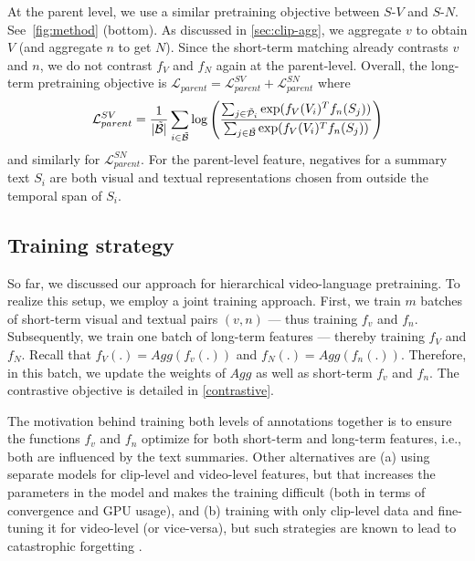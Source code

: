 \documentclass[10pt,twocolumn,letterpaper]{article}
\newcommand{\ccCR}[1]{{\color{black}{}#1}}
\begin{document}
At the parent level, we use a similar pretraining objective between $S$-$V$ and $S$-$N$. See~\cref{fig:method} (bottom).  As discussed in \cref{sec:clip-agg}, we aggregate $v$ to obtain $V$ (and aggregate $n$ to get $N$). Since the short-term matching already contrasts $v$ and $n$, we do not contrast $f_V$ and $f_N$ again at the parent-level. 
Overall, the long-term pretraining objective is $\mathcal{L}_{parent} = \mathcal{L}^{SV}_{parent} + \mathcal{L}^{SN}_{parent}$ where 
$$\mathcal{L}^{SV}_{parent} = \frac{1}{|\Tilde{\mathcal{B}}|} \sum_{i \in \tilde{\mathcal{B}}} \log \left(\frac{\sum_{j \in \mathcal{\tilde{P}}_i} \text{exp}({f_V(V_i)^Tf_n(S_j)})}{ \sum_{j \in \tilde{\mathcal{B}}} \text{exp}(f_V(V_i)^Tf_n(S_j))}\right)$$
and similarly for $\mathcal{L}^{SN}_{parent}$. For the parent-level feature, negatives for a summary text $S_i$ are both visual and textual representations chosen from outside the temporal span of $S_i$.






\subsection{Training strategy} 
\label{pre-train-strategy}


So far, we discussed our approach for hierarchical video-language pretraining. To realize this setup, we employ a joint training approach. First, we train $m$ batches of short-term visual and textual pairs $(v, n)$ --- thus training $f_v$ and $f_n$. Subsequently, we train one batch of long-term features --- thereby training $f_V$ and $f_N$. Recall that $f_V(.) = Agg(f_v(.))$ and $f_N(.) = Agg(f_n(.))$. Therefore, in this batch, we update the weights of $Agg$ as well as short-term $f_v$ and $f_n$. \ccCR{The contrastive objective is detailed in \cref{contrastive}.}

The motivation behind training both levels of annotations together is to ensure the functions $f_v$ and $f_n$ optimize for both short-term and long-term features, i.e., both are influenced by the text summaries. Other alternatives are (a) using separate models for clip-level and video-level features, but that increases the parameters in the model and makes the training difficult (both in terms of convergence and GPU usage), and (b) training with only clip-level data and fine-tuning it for video-level (or vice-versa), but such strategies are known to
lead to catastrophic forgetting \cite{catastrophic-forgetting-1,catastrophic-forgetting-2,catastrophic-forgetting-3}.  
\end{document}
